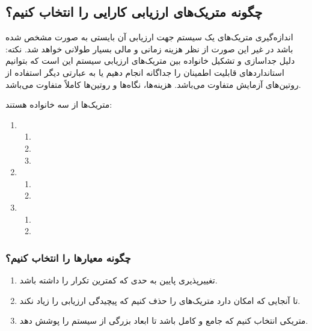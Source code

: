 \subsection{چگونه متریک‌های ارزیابی کارایی را انتخاب کنیم؟}

اندازه‌گیری متریک‌های یک سیستم جهت ارزیابی آن بایستی به صورت مشخص شده باشد در
غیر این صورت از نظر هزینه زمانی و مالی بسیار طولانی خواهد شد. نکته: دلیل جداسازی
و تشکیل خانواده بین متریک‌های ارزیابی سیستم این است که بتوانیم استاندارد‌های
قابلیت اطمینان را جداگانه انجام دهیم یا به عبارتی دیگر استفاده از روتین‌های
آزمایش متفاوت می‌باشد. هزینه‌ها، نگاه‌ها و روتین‌ها کاملاً متفاوت می‌باشد.

متریک‌ها از سه خانواده هستند:

\begin{enumerate}
    \item {}
    \begin{enumerate}
        \item {}
        \item {}
        \item {}
    \end{enumerate}
    \item {}
    \begin{enumerate}
        \item {}
        \item {}
    \end{enumerate}
    \item {}
    \begin{enumerate}
        \item {}
        \item {}
    \end{enumerate}
\end{enumerate}

\subsubsection{چگونه معیار‌ها را انتخاب کنیم؟ }

\begin{enumerate}
    \item تغییر‌پذیری پایین به حدی که کمترین تکرار را داشته باشد. 
    \item تا آنجایی که امکان دارد متریک‌های  را حذف کنیم که
    پیچیدگی ارزیابی را زیاد نکند.
    \item متریکی انتخاب کنیم که جامع و کامل باشد تا ابعاد بزرگی از سیستم را پوشش
    دهد.
\end{enumerate}

